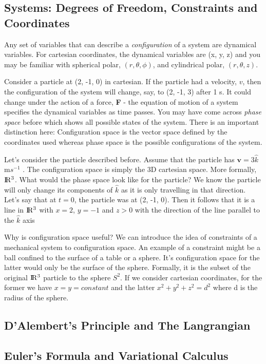 \subsection{Systems: Degrees of Freedom, Constraints and Coordinates}
Any set of variables that can describe a \textit{configuration} of a system are dynamical variables. For cartesian coordinates, the dynamical variables are (x, y, z) and you may be familiar with spherical polar, $(r, \theta, \phi)$, and cylindrical polar, $(r, \theta, z)$. \par
Consider a particle at (2, -1, 0) in cartesian. If the particle had a velocity, $v$, then the configuration of the system will change, say, to (2, -1, 3) after 1 s. It could change under the action of a force, \textbf{F} - the equation of motion of a system specifies the dynamical variables as time passes. You may have come across \textit{phase space} before which shows all possible states of the system. There is an important distinction here: Configuration space is the vector space defined by the coordinates used whereas phase space is the possible configurations of the system. \par

Let's consider the particle described before. Assume that the particle has $\textbf{v} = 3\hat{k}$ m$s^{-1}$ . The configuration space is simply the 3D cartesian space. More formally, $\rm I\!R^{3}$. What would the phase space look like for the particle? We know the particle will only change its components of $\hat{k}$ as it is only travelling in that direction. Let's say that at $t=0$, the particle was at (2, -1, 0). Then it follows that it is a line in $\rm I\!R^{3}$ with $x=2$, $y=-1$ and $z>0$ with the direction of the line parallel to the $\hat{k}$ axis\par

Why is configuration space useful? We can introduce the idea of constraints of a mechanical system to configuration space. An example of a constraint might be a ball confined to the surface of a table or a sphere. It's configuration space for the latter would only be the surface of the sphere. Formally, it is the subset of the original $\rm I\!R^{3}$ particle to the sphere $S^{2}$. If we consider cartesian coordinates, for the former we have $x=y=constant$ and the latter $x^{2} + y^{2} + z^{2} = d^{2}$ where d is the radius of the sphere. 














\subsection{D'Alembert's Principle and The Langrangian}
\subsection{Euler's Formula and Variational Calculus}